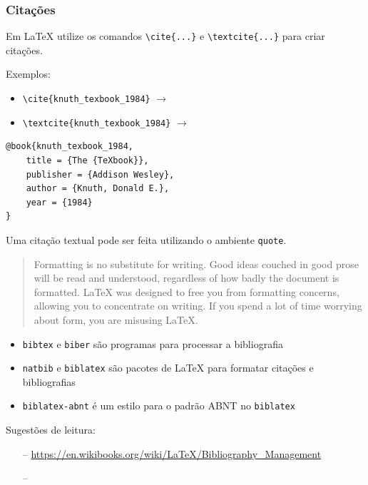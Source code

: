 \begin{frame}
\frametitle{Citações}
Em \LaTeX{} utilize os comandos \verb|\cite{...}| e \verb|\textcite{...}| para criar citações.

\vspace{1ex}
Exemplos:
\begin{itemize}
\item \verb|\cite{knuth_texbook_1984}| $\rightarrow$ \cite{knuth_texbook_1984}
\item \verb|\textcite{knuth_texbook_1984}| $\rightarrow$ \textcite{knuth_texbook_1984}
\end{itemize}

\begin{lstlisting}[language=tex, label=lst-bib, caption={Arquivo \texttt{.bib}.}, postbreak=\mbox{$\hookrightarrow$\space}, basicstyle=\fontsize{8}{10}\selectfont\ttfamily]
@book{knuth_texbook_1984,
    title = {The {TeXbook}},
    publisher = {Addison Wesley},
    author = {Knuth, Donald E.},
    year = {1984}
}
\end{lstlisting}

\framebreak

Uma citação textual pode ser feita utilizando o ambiente \verb|quote|.

\begin{LTXexample}
\begin{quote}
Formatting is no substitute for writing. Good ideas couched in
good prose will be read and understood, regardless of how badly the document
is formatted. \LaTeX{} was designed to free you from formatting concerns, allowing
you to concentrate on writing. If you spend a lot of time worrying about form,
you are misusing \LaTeX{}.
\end{quote}
\end{LTXexample}
\cite{lamport_latex_1994}

\framebreak

\begin{itemize}
\item \texttt{bibtex} e \texttt{biber} são programas para processar a bibliografia
\item \texttt{natbib} e \texttt{biblatex} são pacotes de \LaTeX{} para formatar citações e bibliografias
\item \texttt{biblatex-abnt} é um estilo para o padrão ABNT no \texttt{biblatex} 
\end{itemize}

\vspace{2ex}
Sugestões de leitura:
\begin{itemize}
\item[--] \url{https://en.wikibooks.org/wiki/LaTeX/Bibliography_Management}
\item[--] 
\end{itemize}
\end{frame}

